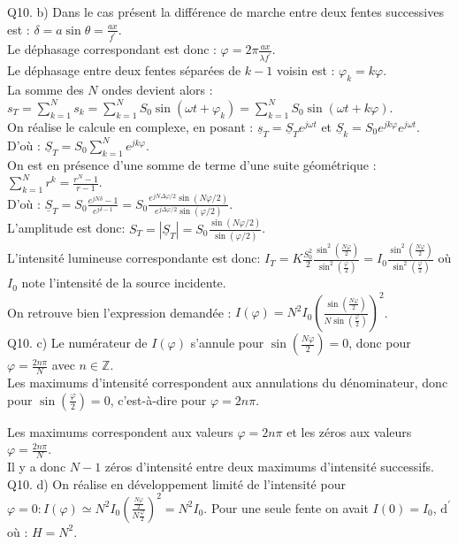 \documentclass[10pt]{article}
\begin{document}
Q10. b) Dans le cas présent la différence de marche entre deux fentes successives est : \(\delta=a \sin \theta=\frac{a x}{f^{\prime}}\).\\
Le déphasage correspondant est donc : \(\varphi=2 \pi \frac{a x}{\lambda f^{\prime}}\).\\
Le déphasage entre deux fentes séparées de \(k-1\) voisin est : \(\varphi_{k}=k \varphi\).\\
La somme des \(N\) ondes devient alors : \(s_{T}=\sum_{k=1}^{N} s_{k}=\sum_{k=1}^{N} S_{0} \sin \left(\omega t+\varphi_{k}\right)=\sum_{k=1}^{N} S_{0} \sin (\omega t+k \varphi)\).\\
On réalise le calcule en complexe, en posant : \(\underline{s}_{T}=\underline{S}_{T} e^{j \omega t}\) et \(\underline{S}_{k}=S_{0} e^{j k \varphi} e^{j \omega t}\).\\
D'où : \(\underline{S}_{T}=S_{0} \sum_{k=1}^{N} e^{j k \varphi}\).\\
On est en présence d'une somme de terme d'une suite géométrique : \(\sum_{k=1}^{N} r^{k}=\frac{r^{N}-1}{r-1}\).\\
D'où : \(\underline{S}_{T}=S_{0} \frac{e^{j N \delta}-1}{e^{j \delta-1}}=S_{0} \frac{e^{j N \Delta \varphi / 2} \sin (N \varphi / 2)}{e^{j \Delta \varphi / 2} \sin (\varphi / 2)}\).\\
L'amplitude est donc: \(S_{T}=\left|\underline{S}_{T}\right|=S_{0} \frac{\sin (N \varphi / 2)}{\sin (\varphi / 2)}\).\\
L'intensité lumineuse correspondante est donc: \(I_{T}=K \frac{S_{0}^{2}}{2} \frac{\sin ^{2}\left(\frac{N \varphi}{2}\right)}{\sin ^{2}\left(\frac{\varphi}{2}\right)}=I_{0} \frac{\sin ^{2}\left(\frac{N \varphi}{2}\right)}{\sin ^{2}\left(\frac{\varphi}{2}\right)}\) où \(I_{0}\) note l'intensité de la source incidente.\\
On retrouve bien l'expression demandée : \(I(\varphi)=N^{2} I_{0}\left(\frac{\sin \left(\frac{N \varphi}{2}\right)}{N \sin \left(\frac{\varphi}{2}\right)}\right)^{2}\).\\
Q10. c) Le numérateur de \(I(\varphi)\) s'annule pour \(\sin \left(\frac{N \varphi}{2}\right)=0\), donc pour \(\varphi=\frac{2 n \pi}{N}\) avec \(n \in \mathbb{Z}\).\\
Les maximums d'intensité correspondent aux annulations du dénominateur, donc pour \(\sin \left(\frac{\varphi}{2}\right)=0\), c'est-à-dire pour \(\varphi=2 n \pi\).

Les maximums correspondent aux valeurs \(\varphi=2 n \pi\) et les zéros aux valeurs \(\varphi=\frac{2 n \pi}{N}\).\\
Il y a donc \(N-1\) zéros d'intensité entre deux maximums d'intensité successifs.\\
Q10. d) On réalise en développement limité de l'intensité pour \(\varphi=0: I(\varphi) \simeq N^{2} I_{0}\left(\frac{\frac{N \varphi}{2}}{N \frac{\varphi}{2}}\right)^{2}=N^{2} I_{0}\). Pour une seule fente on avait \(I(0)=I_{0}\), \(\mathrm{d}^{\prime}\) où : \(H=N^{2}\).
\end{document}
